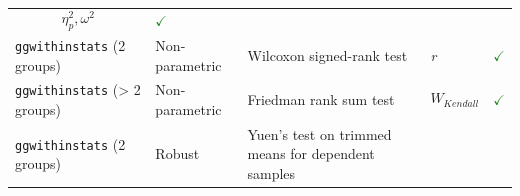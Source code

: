 \documentclass[
]{article}
\begin{document}
\begin{longtable}[]{@{}lllll@{}}
\begin{minipage}[t]{0.12\columnwidth}
\[\eta^2_p, \omega^2\]\strut
\end{minipage} & \begin{minipage}[t]{0.07\columnwidth}\raggedright
\textcolor{ForestGreen}{$\checkmark$}\strut
\end{minipage}\tabularnewline
\begin{minipage}[t]{0.20\columnwidth}\raggedright
\texttt{ggwithinstats} (2 groups)\strut
\end{minipage} & \begin{minipage}[t]{0.16\columnwidth}\raggedright
Non-parametric\strut
\end{minipage} & \begin{minipage}[t]{0.31\columnwidth}\raggedright
Wilcoxon signed-rank test\strut
\end{minipage} & \begin{minipage}[t]{0.12\columnwidth}\raggedright
\emph{r}\strut
\end{minipage} & \begin{minipage}[t]{0.07\columnwidth}\raggedright
\textcolor{ForestGreen}{$\checkmark$}\strut
\end{minipage}\tabularnewline
\begin{minipage}[t]{0.20\columnwidth}\raggedright
\texttt{ggwithinstats} (\textgreater{} 2 groups)\strut
\end{minipage} & \begin{minipage}[t]{0.16\columnwidth}\raggedright
Non-parametric\strut
\end{minipage} & \begin{minipage}[t]{0.31\columnwidth}\raggedright
Friedman rank sum test\strut
\end{minipage} & \begin{minipage}[t]{0.12\columnwidth}\raggedright
\[W_{Kendall}\]\strut
\end{minipage} & \begin{minipage}[t]{0.07\columnwidth}\raggedright
\textcolor{ForestGreen}{$\checkmark$}\strut
\end{minipage}\tabularnewline
\begin{minipage}[t]{0.20\columnwidth}\raggedright
\texttt{ggwithinstats} (2 groups)\strut
\end{minipage} & \begin{minipage}[t]{0.16\columnwidth}\raggedright
Robust\strut
\end{minipage} & \begin{minipage}[t]{0.31\columnwidth}\raggedright
Yuen's test on trimmed means for dependent samples\strut

\end{minipage}
\end{longtable}
\end{document}
